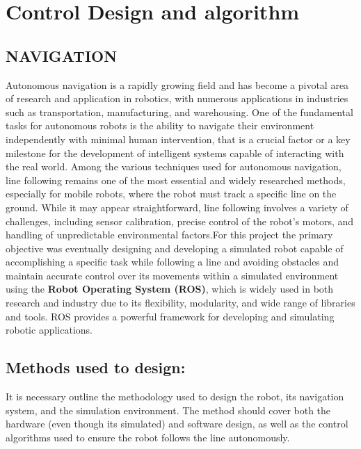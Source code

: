 \documentclass[../../main]{subfiles}
\begin{document}
\section{Control Design and algorithm}
\subsection{NAVIGATION}
    Autonomous navigation is a rapidly growing field and has become a
    pivotal area of research and application in robotics, with numerous
    applications in industries such as transportation, manufacturing, and
    warehousing. One of the fundamental tasks for autonomous robots is the
    ability to navigate their environment independently with minimal human
    intervention, that is a crucial factor or a key milestone for the
    development of intelligent systems capable of interacting with the real
    world. Among the various techniques used for autonomous navigation, line
    following remains one of the most essential and widely researched
    methods, especially for mobile robots, where the robot must track a
    specific line on the ground. While it may appear straightforward, line
    following involves a variety of challenges, including sensor
    calibration, precise control of the robot's motors, and handling of
    unpredictable environmental factors.For this project the primary
    objective was eventually designing and developing a simulated robot
    capable of accomplishing a specific task while following a line and
    avoiding obstacles and maintain accurate control over its movements
    within a simulated environment using the \textbf{Robot Operating System
    (ROS)}, which is widely used in both research and industry due to its
    flexibility, modularity, and wide range of libraries and tools. ROS
    provides a powerful framework for developing and simulating robotic
    applications.
    
    
    \subsection*{Methods used to design:}

    
    It is necessary outline the methodology used to design the robot, its
    navigation system, and the simulation environment. The method should
    cover both the hardware (even though it\textquotesingle s simulated) and
    software design, as well as the control algorithms used to ensure the
    robot follows the line autonomously.
    
\end{document}
